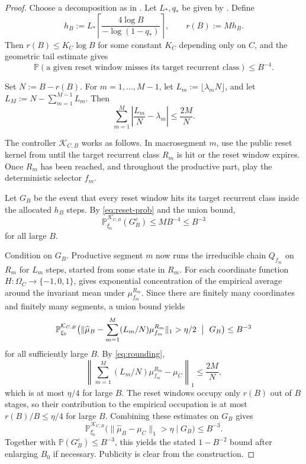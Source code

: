 \documentclass[12pt]{article}
\theoremstyle{definition}
\newcommand{\Pb}{\mathbb{P}}
\newcommand{\1}{\mathbf{1}}
\newcommand{\cK}{\mathcal{K}}
\begin{document}
\begin{proof}
Choose a decomposition as in .  Let \(L_*,q_*\) be given by
.  Define
\[
h_B
:=
L_*\left\lceil \frac{4\log B}{-\log(1-q_*)}\right\rceil,
\qquad
r(B):=Mh_B.
\]
Then \(r(B)\le K_C\log B\) for some constant \(K_C\) depending only on \(C\), and the
geometric tail estimate gives
\begin{equation}
\label{eq:reset-prob}
\Pb(\text{a given reset window misses its target recurrent class})\le B^{-4}.
\end{equation}

Set \(N:=B-r(B)\).  For \(m=1,\dots,M-1\), let \(L_m:=\lfloor \lambda_m N\rfloor\), and
let \(L_M:=N-\sum_{m=1}^{M-1}L_m\).  Then
\begin{equation}
\label{eq:rounding}
\sum_{m=1}^M\left|\frac{L_m}{N}-\lambda_m\right|\le \frac{2M}{N}.
\end{equation}

The controller \(\cK_{C,B}\) works as follows.  In macrosegment \(m\), use the public reset
kernel from  until the target recurrent class \(R_m\) is hit or the
reset window expires.  Once \(R_m\) has been reached, and throughout the productive part,
play the deterministic selector \(f_m\).

Let \(G_B\) be the event that every reset window hits its target recurrent class inside the
allocated \(h_B\) steps.  By \eqref{eq:reset-prob} and the union bound,
\[
\Pb_{\xi_0}^{\cK_{C,B}}(G_B^c)\le MB^{-4}\le B^{-3}
\]
for all large \(B\).

Condition on \(G_B\).  Productive segment \(m\) now runs the irreducible chain \(Q_{f_m}\)
on \(R_m\) for \(L_m\) steps, started from some state in \(R_m\).  For each coordinate
function \(H:\Omega_C\to \{-1,0,1\}\),  gives exponential concentration
of the empirical average around the invariant mean under \(\mu_{f_m}^{R_m}\).  Since there
are finitely many coordinates and finitely many segments, a union bound yields
\[
\Pb_{\xi_0}^{\cK_{C,B}}\bigl(\|\widehat\mu_B-\sum_{m=1}^M (L_m/N)\mu_{f_m}^{R_m}\|_1>\eta/2
\ \bigm|\ G_B\bigr)\le B^{-3}
\]
for all sufficiently large \(B\).  By \eqref{eq:rounding},
\[
\left\|\sum_{m=1}^M (L_m/N)\mu_{f_m}^{R_m}-\mu_C\right\|_1\le \frac{2M}{N},
\]
which is at most \(\eta/4\) for large \(B\).  The reset windows occupy only \(r(B)\) out of
\(B\) stages, so their contribution to the empirical occupation is at most \(r(B)/B\le
\eta/4\) for large \(B\).  Combining these estimates on \(G_B\) gives
\[
\Pb_{\xi_0}^{\cK_{C,B}}\bigl(\|\widehat\mu_B-\mu_C\|_1>\eta\mid G_B\bigr)\le B^{-3}.
\]
Together with \(\Pb(G_B^c)\le B^{-3}\), this yields the stated
\(1-B^{-2}\) bound after enlarging \(B_0\) if necessary.  Publicity is clear from the
construction.
\end{proof}
\end{document}
